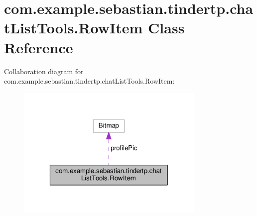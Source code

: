 \hypertarget{classcom_1_1example_1_1sebastian_1_1tindertp_1_1chatListTools_1_1RowItem}{}\section{com.\+example.\+sebastian.\+tindertp.\+chat\+List\+Tools.\+Row\+Item Class Reference}
\label{classcom_1_1example_1_1sebastian_1_1tindertp_1_1chatListTools_1_1RowItem}


Collaboration diagram for com.\+example.\+sebastian.\+tindertp.\+chat\+List\+Tools.\+Row\+Item\+:\nopagebreak
\begin{figure}[H]
\begin{center}
\leavevmode
\includegraphics[width=256pt]{classcom_1_1example_1_1sebastian_1_1tindertp_1_1chatListTools_1_1RowItem__coll__graph}
\end{center}
\end{figure}

